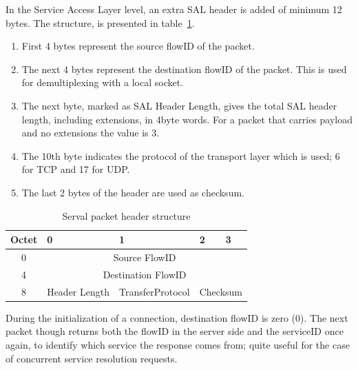 In the Service Access Layer level, an extra SAL header is added of minimum 12 bytes.
The structure, is presented in table~\ref{table:salheader}.
\begin{enumerate} \itemsep1pt \parskip0pt 
  \item First 4 bytes represent the source flowID of the packet.
  \item The next 4 bytes represent the destination flowID of the packet.
  This is used for demultiplexing with a local socket.
  \item The next byte, marked as SAL Header Length, gives the total SAL header length, including extensions, in 4byte words.
  For a packet that carries payload and no extensions the value is 3.
  \item The 10th byte indicates the protocol of the transport layer which is used; 6 for TCP and 17 for UDP.
  \item The last 2 bytes of the header are used as checksum.
\end{enumerate}

\begin{table}
\begin{center}
  \begin{tabularx}{\linewidth}{|c|X|X|X|X|}
  	\hline
  	Octet &	0 & 1 & 2 & 3 \\ \hline
  	0 & \multicolumn{4}{c|}{Source FlowID}\\ \hline
  	4 & \multicolumn{4}{c|}{Destination FlowID}\\ \hline
  	8 &	Header Length & {Transfer\linebreak Protocol} &	\multicolumn{2}{|c|}{Checksum}	\\
	\hline
  \end{tabularx}
  \caption[Serval packet header structure]{Serval packet header structure}
  \label{table:salheader}
\end{center}
\end{table}

During the initialization of a connection, destination flowID is zero (0).
The next packet though returns both the flowID in the server side and the serviceID once again, to identify which service the response comes from; quite useful for the case of concurrent service resolution requests.


